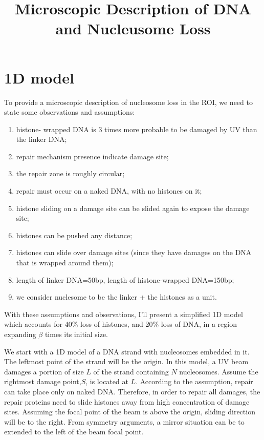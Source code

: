 \documentclass[12pt]{paper}
\begin{document}
\title{Microscopic Description of DNA and Nucleusome Loss}
\maketitle
\section{1D model}
  To provide a microscopic description of nucleosome loss in the ROI, we need to state some observations and assumptions:
  \begin{enumerate}
  	\itemsep0em
  	\item histone- wrapped DNA is 3 times more probable to be damaged by UV than the linker DNA;
  	\item repair mechanism presence indicate damage site;
  	\item the repair zone is roughly circular;  
  	\item repair must occur on a naked DNA, with no histones on it; 
  	\item histone sliding on a damage site can be slided again to expose the damage site;
  	\item histones can be pushed any distance;
  	\item histones can slide over damage sites (since they have damages on the DNA that is wrapped around them);
  	\item length of linker DNA=50bp, length of histone-wrapped DNA=150bp;
  	\item we consider nuclesome to be the linker + the histones as a unit.   
  \end{enumerate}
     With these assumptions and observations, I'll present a simplified 1D model which accounts for 40\% loss of histones, and 20\% loss of DNA, in a region expanding $\beta$ times its initial size. 
     
     We start with a 1D model of a DNA strand with nucleosomes embedded in it. The leftmost point of the strand will be the origin. In this model, a UV beam damages a portion of size $L$ of the strand containing $N$ nucleosomes. Assume the rightmost damage point,$S$, is located at $L$. According to the assumption, repair can take place only on naked DNA. Therefore, in order to repair all damages, the repair proteins need to slide histones away from high concentration of damage sites. Assuming the focal point of the beam is above the origin, sliding direction will be to the right. From symmetry arguments, a mirror situation can be to extended to the left of the beam focal point.     
     
\end{document}

